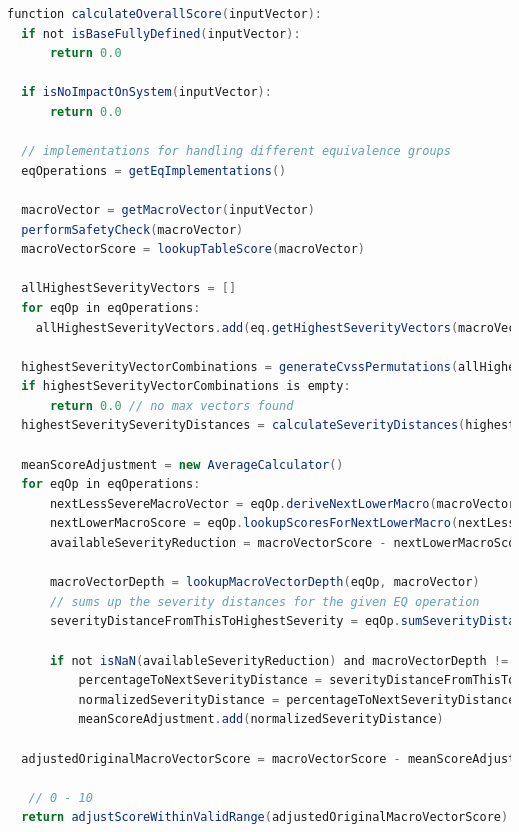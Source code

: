 \begin{lstlisting}[language=Java, label={lst:cvss-typescript-cvss-4P0-calculateOverallScore-pseudocode}, caption={CVSS 4.0 Score-Berechnung Pseudocode}]
function calculateOverallScore(inputVector):
  if not isBaseFullyDefined(inputVector):
      return 0.0

  if isNoImpactOnSystem(inputVector):
      return 0.0

  // implementations for handling different equivalence groups
  eqOperations = getEqImplementations()

  macroVector = getMacroVector(inputVector)
  performSafetyCheck(macroVector)
  macroVectorScore = lookupTableScore(macroVector)

  allHighestSeverityVectors = []
  for eqOp in eqOperations:
    allHighestSeverityVectors.add(eq.getHighestSeverityVectors(macroVector))

  highestSeverityVectorCombinations = generateCvssPermutations(allHighestSeverityVectors)
  if highestSeverityVectorCombinations is empty:
      return 0.0 // no max vectors found
  highestSeveritySeverityDistances = calculateSeverityDistances(highestSeverityVectorCombinations)

  meanScoreAdjustment = new AverageCalculator()
  for eqOp in eqOperations:
      nextLessSevereMacroVector = eqOp.deriveNextLowerMacro(macroVector)
      nextLowerMacroScore = eqOp.lookupScoresForNextLowerMacro(nextLessSevereMacroVector)
      availableSeverityReduction = macroVectorScore - nextLowerMacroScore

      macroVectorDepth = lookupMacroVectorDepth(eqOp, macroVector)
      // sums up the severity distances for the given EQ operation
      severityDistanceFromThisToHighestSeverity = eqOp.sumSeverityDistances(highestSeveritySeverityDistances)

      if not isNaN(availableSeverityReduction) and macroVectorDepth != 0.0:
          percentageToNextSeverityDistance = severityDistanceFromThisToHighestSeverity / macroVectorDepth
          normalizedSeverityDistance = percentageToNextSeverityDistance * availableSeverityReduction
          meanScoreAdjustment.add(normalizedSeverityDistance)

  adjustedOriginalMacroVectorScore = macroVectorScore - meanScoreAdjustment.average()

   // 0 - 10
  return adjustScoreWithinValidRange(adjustedOriginalMacroVectorScore)
\end{lstlisting}
